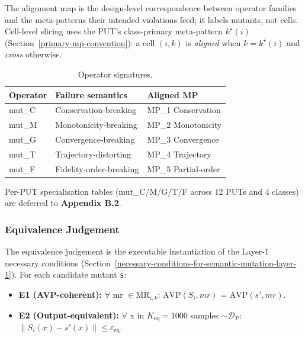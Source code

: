 \documentclass[manuscript,screen,review]{acmart}
\begin{document}
The alignment map is the design-level correspondence between operator
families and the meta-patterns their intended violations feed; it labels
mutants, not cells. Cell-level slicing uses the PUT's class-primary
meta-pattern $k^\star(i)$ (Section~\ref{primary-mp-convention}): a cell
$(i,k)$ is \emph{aligned} when $k = k^\star(i)$ and \emph{cross}
otherwise.

\begin{table}[t]
\caption{Operator signatures.}\label{tab:p2-01}
\centering
\begin{tabular}{@{}lll@{}}
\toprule
Operator & Failure semantics & Aligned MP \\
\midrule
mut\_C & Conservation-breaking & MP\_1 Conservation \\
mut\_M & Monotonicity-breaking & MP\_2 Monotonicity \\
mut\_G & Convergence-breaking & MP\_3 Convergence \\
mut\_T & Trajectory-distorting & MP\_4 Trajectory \\
mut\_F & Fidelity-order-breaking & MP\_5 Partial-order \\
\bottomrule
\end{tabular}
\end{table}

Per-PUT specialisation tables (mut\_C/M/G/T/F across 12 PUTs and 4
classes) are deferred to \textbf{Appendix B.2}.

\subsubsection{Equivalence Judgement}\label{equivalence-judgement-e1-e2-layer-2}

The equivalence judgement is the executable instantiation of the Layer-1
necessary conditions (Section~\ref{necessary-conditions-for-semantic-mutation-layer-1}). For each candidate mutant
\texttt{s\textquotesingle{}}:

\begin{itemize}

\item
  \textbf{E1 (AVP-coherent):} $\forall$ mr $\in \mathrm{MR}_{i,k}$: $\mathrm{AVP}(S_i, mr)$ =
  $\mathrm{AVP}(s', mr)$.
\item
  \textbf{E2 (Output-equivalent):} $\forall$ x in $K_{\mathrm{eq}}=1000$ samples
  $\sim \mathcal{D}_P$: $\|S_i(x) - s'(x)\| \leq \varepsilon_{\mathrm{eq}}$.
\end{itemize}
\end{document}
